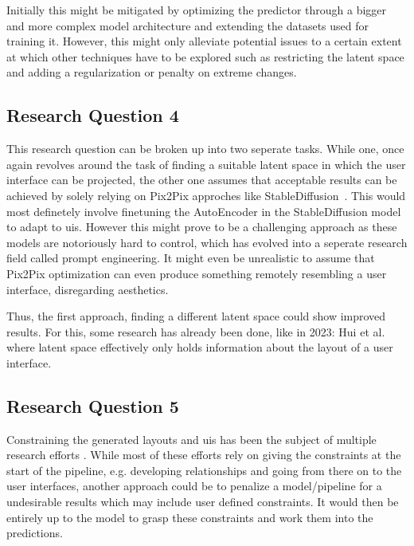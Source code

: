 \documentclass[10pt,a4paper]{scrartcl} %
\begin{document}
Initially this might be mitigated by optimizing the predictor through a bigger and more complex model architecture and 
extending the datasets used for training it. However, this might only alleviate potential issues to a certain extent
at which other techniques have to be explored such as restricting the latent space and adding a regularization or penalty on 
extreme changes.

\subsection{Research Question 4}
This research question can be broken up into two seperate tasks. While one, once again revolves around the task of finding
a suitable latent space in which the user interface can be projected, the other one assumes that acceptable results can
be achieved by solely relying on Pix2Pix approches like StableDiffusion~\cite{rombach2021highresolution}. This would most
definetely involve finetuning the AutoEncoder in the StableDiffusion model to adapt to \ac{uis}. However this might prove
to be a challenging approach as these models are notoriously hard to control, which has evolved into a seperate research field
called prompt engineering. It might even be unrealistic to assume that Pix2Pix optimization can even produce something remotely
resembling a user interface, disregarding aesthetics.

Thus, the first approach, finding a different latent space could show improved results. For this, some research has already
been done, like in 2023: Hui et al. \cite{hui2023unifying} where latent space effectively only holds information about the 
layout of a user interface.

\subsection{Research Question 5}
Constraining the generated layouts and \ac{uis} has been the subject of multiple research efforts \cite{lee2020neural}. 
While most of these efforts rely on giving the constraints at the start of the pipeline, e.g. developing relationships and
going from there on to the user interfaces, another approach could be to penalize a model/pipeline for a undesirable results
which may include user defined constraints. It would then be entirely up to the model to grasp these constraints and work
them into the predictions.
\end{document}

